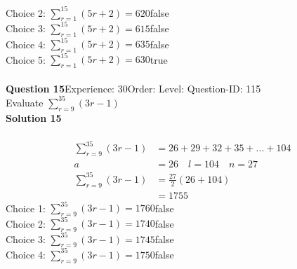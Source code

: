 \documentclass{article}
\begin{document}
Choice 2: \hspace{20pt}$\displaystyle\sum_{r=1}^{15} (5r+2)=620$\hspace{20pt}false\\
Choice 3: \hspace{20pt}$\displaystyle\sum_{r=1}^{15} (5r+2)=615$\hspace{20pt}false\\
Choice 4: \hspace{20pt}$\displaystyle\sum_{r=1}^{15} (5r+2)=635$\hspace{20pt}false\\
Choice 5: \hspace{20pt}$\displaystyle\sum_{r=1}^{15} (5r+2)=630$\hspace{20pt}true\\
\\[4pt]
\noindent\textbf{Question 15}\hspace{20pt}Experience: 30\hspace{20pt}Order: \hspace{20pt}Level: \hspace{20pt}Question-ID: 115\\[2pt]
Evaluate $\displaystyle\sum_{r=9}^{35} (3r-1)$\\[4pt]
\noindent\textbf{Solution 15}\\[2pt]
\\[-35pt]\begin{align*}
\displaystyle\sum_{r=9}^{35} (3r-1)&=26+29+32+35+...+104\\[2pt]
a&=26\quad l=104 \quad n=27\\[2pt]
\displaystyle\sum_{r=9}^{35} (3r-1)&=\displaystyle\frac{27}{2}(26+104)\\[2pt]
&=1755
\end{align*}
Choice 1: \hspace{20pt}$\displaystyle\sum_{r=9}^{35} (3r-1)=1760$\hspace{20pt}false\\
Choice 2: \hspace{20pt}$\displaystyle\sum_{r=9}^{35} (3r-1)=1740$\hspace{20pt}false\\
Choice 3: \hspace{20pt}$\displaystyle\sum_{r=9}^{35} (3r-1)=1745$\hspace{20pt}false\\
Choice 4: \hspace{20pt}$\displaystyle\sum_{r=9}^{35} (3r-1)=1750$\hspace{20pt}false\\
\end{document}
